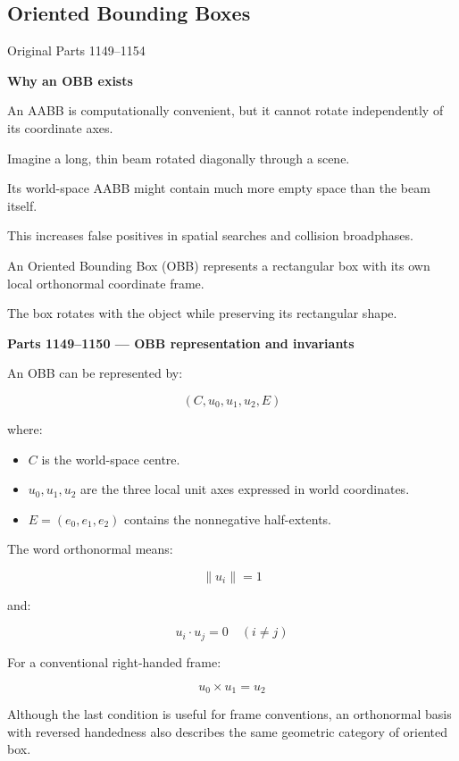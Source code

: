\subsection{Oriented Bounding Boxes}\label{03-visual-computing-i-ch021-oriented-bounding-boxes}

\hypertarget{03-visual-computing-i-ch021-oriented-bounding-boxes}{}

Original Parts 1149--1154

\textbf{Why an OBB exists}

An AABB is computationally convenient, but it cannot rotate independently of its coordinate axes.

Imagine a long, thin beam rotated diagonally through a scene.

Its world-space AABB might contain much more empty space than the beam itself.

This increases false positives in spatial searches and collision broadphases.

An Oriented Bounding Box (OBB) represents a rectangular box with its own local orthonormal coordinate frame.

The box rotates with the object while preserving its rectangular shape.

\textbf{Parts 1149--1150 --- OBB representation and invariants}

An OBB can be represented by:

\[
(C,u_0,u_1,u_2,E)
\]

where:

\begin{itemize}
\tightlist
\item
  \(C\) is the world-space centre.
\item
  \(u_0,u_1,u_2\) are the three local unit axes expressed in world coordinates.
\item
  \(E=(e_0,e_1,e_2)\) contains the nonnegative half-extents.
\end{itemize}

The word orthonormal means:

\[
\boxed{\|u_i\|=1}
\]

and:

\[
\boxed{u_i\cdot u_j=0\quad(i\ne j)}
\]

For a conventional right-handed frame:

\[
u_0\times u_1=u_2
\]

Although the last condition is useful for frame conventions, an orthonormal basis with reversed handedness also describes the same geometric category of oriented box.

